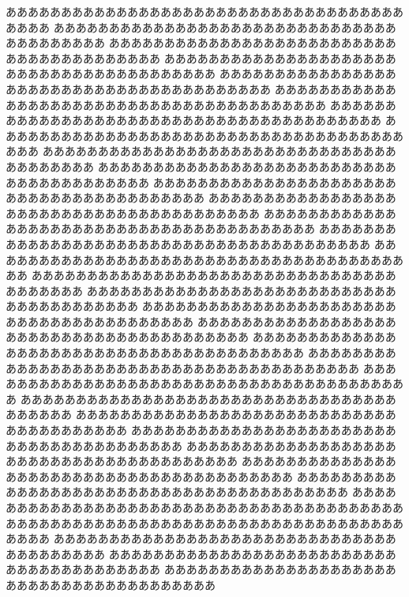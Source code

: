 \documentclass[twocolumn,tombow]{ltjsarticle}
\begin{document}
ああああああああああああああああああああああああああああああああああああああああ
ああああああああああああああああああああああああああああああああああああああああ
ああああああああああああああああああああああああああああああああああああああああ
ああああああああああああああああああああああああああああああああああああああああ
ああああああああああああああああああああああああああああああああああああああああ
ああああああああああああああああああああああああああああああああああああああああ
ああああああああああああああああああああああああああああああああああああああああ
ああああああああああああああああああああああああああああああああああああああああ
ああああああああああああああああああああああああああああああああああああああああ
ああああああああああああああああああああああああああああああああああああああああ
ああああああああああああああああああああああああああああああああああああああああ
ああああああああああああああああああああああああああああああああああああああああ
ああああああああああああああああああああああああああああああああああああああああ
ああああああああああああああああああああああああああああああああああああああああ
ああああああああああああああああああああああああああああああああああああああああ
ああああああああああああああああああああああああああああああああああああああああ
ああああああああああああああああああああああああああああああああああああああああ
ああああああああああああああああああああああああああああああああああああああああ
ああああああああああああああああああああああああああああああああああああああああ
ああああああああああああああああああああああああああああああああああああああああ
ああああああああああああああああああああああああああああああああああああああああ
ああああああああああああああああああああああああああああああああああああああああ
ああああああああああああああああああああああああああああああああああああああああ
ああああああああああああああああああああああああああああああああああああああああ
ああああああああああああああああああああああああああああああああああああああああ
ああああああああああああああああああああああああああああああああああああああああ
ああああああああああああああああああああああああああああああああああああああああ
ああああああああああああああああああああああああああああああああああああああああ
ああああああああああああああああああああああああああああああああああああああああ
ああああああああああああああああああああああああああああああああああああああああ
ああああああああああああああああああああああああああああああああああああああああ
ああああああああああああああああああああああああああああああああああああああああ
ああああああああああああああああああああああああああああああああああああああああ
\end{document}
